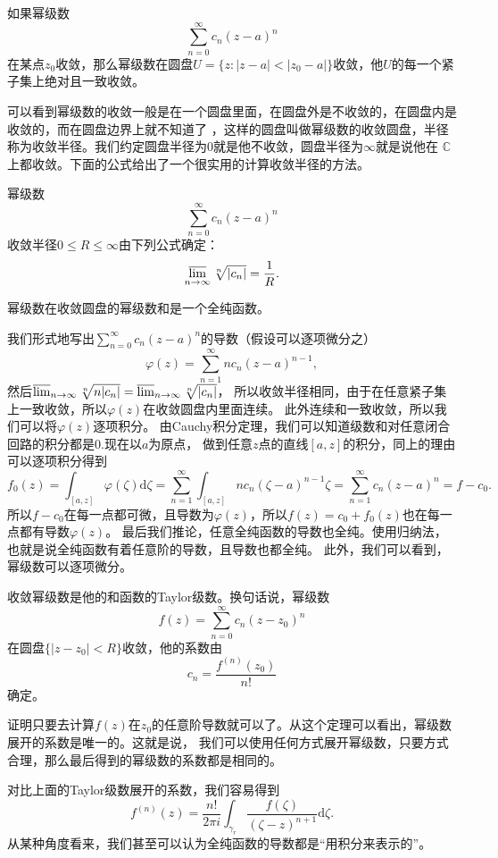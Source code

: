 \begin{pro}[Abel]
    如果幂级数
	\[ \sum_{n=0}^\infty c_n (z-a)^n\]
	在某点$z_0$收敛，那么幂级数在圆盘$U=\{z:|z-a|<|z_0-a|\}$收敛，他$U$的每一个紧子集上绝对且一致收敛。 
\end{pro}
可以看到幂级数的收敛一般是在一个圆盘里面，在圆盘外是不收敛的，在圆盘内是收敛的，而在圆盘边界上就不知道了
，这样的圆盘叫做幂级数的收敛圆盘，半径称为收敛半径。我们约定圆盘半径为0就是他不收敛，圆盘半径为$\infty$就是说他在
$\mathbb{C}$上都收敛。下面的公式给出了一个很实用的计算收敛半径的方法。
\begin{pro}
    幂级数
	\[ \sum_{n=0}^\infty c_n (z-a)^n\]
    收敛半径$0\leq R \leq \infty$由下列公式确定：\[\varlimsup_{n\to \infty} \sqrt[n]{|c_n|}=\frac{1}{R}.\]
\end{pro}
\begin{pro}
	幂级数在收敛圆盘的幂级数和是一个全纯函数。
\end{pro}
我们形式地写出$\sum_{n=0}^\infty c_n (z-a)^n$的导数（假设可以逐项微分之）
\[
    \varphi(z)=\sum_{n=1}^\infty nc_n (z-a)^{n-1},
\]
然后$\varlimsup_{n\to \infty} \sqrt[n]{n|c_n|}=\varlimsup_{n\to \infty} \sqrt[n]{|c_n|}$，
所以收敛半径相同，由于在任意紧子集上一致收敛，所以$\varphi(z)$在收敛圆盘内里面连续。
此外连续和一致收敛，所以我们可以将$\varphi(z)$逐项积分。
由Cauchy积分定理，我们可以知道级数和对任意闭合回路的积分都是0.现在以$a$为原点，
做到任意$z$点的直线$[a,z]$的积分，同上的理由可以逐项积分得到
\[
f_0(z)=\int_{[a,z]}\varphi(\zeta)\mathrm{d}\zeta=\sum_{n=1}^\infty\int_{[a,z]} nc_n (\zeta-a)^{n-1}\zeta
=\sum_{n=1}^\infty c_n (z-a)^n=f-c_0.
\]
所以$f-c_0$在每一点都可微，且导数为$\varphi(z)$，所以$f(z)=c_0+f_0(z)$也在每一点都有导数$\varphi(z)$。
最后我们推论，任意全纯函数的导数也全纯。使用归纳法，也就是说全纯函数有着任意阶的导数，且导数也都全纯。
此外，我们可以看到，幂级数可以逐项微分。
\begin{pro}
	收敛幂级数是他的和函数的Taylor级数。换句话说，幂级数\[f(z)=\sum_{n=0}^\infty c_n (z-z_0)^n\]
    在圆盘$\{|z-z_0|<R\}$收敛，他的系数由
	\[
		c_n=\frac{f^{(n)}(z_0)}{n!}
	\]
	确定。
\end{pro}
证明只要去计算$f(z)$在$z_0$的任意阶导数就可以了。从这个定理可以看出，幂级数展开的系数是唯一的。这就是说，
我们可以使用任何方式展开幂级数，只要方式合理，那么最后得到的幂级数的系数都是相同的。

对比上面的Taylor级数展开的系数，我们容易得到
\[
    f^{(n)}(z)=\frac{n!}{2\pi i}\int_{\gamma_r}\frac{f(\zeta)}{(\zeta -z)^{n+1}}\mathrm{d}\zeta.
\]
从某种角度看来，我们甚至可以认为全纯函数的导数都是“用积分来表示的”。

